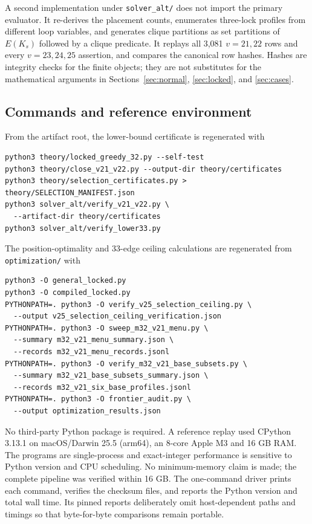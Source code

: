 \documentclass[11pt]{article}
\theoremstyle{remark}
\begin{document}
A second implementation under \texttt{solver\_alt/} does not import the
primary evaluator.  It re-derives the placement counts, enumerates
three-lock profiles from different loop variables, and generates clique
partitions as set partitions of $E(K_s)$ followed by a clique predicate.  It
replays all 3,081 $v=21,22$ rows and every $v=23,24,25$ assertion, and
compares the canonical row hashes.  Hashes are integrity checks for the
finite objects; they are not substitutes for the mathematical arguments in
Sections~\ref{sec:normal}, \ref{sec:locked}, and \ref{sec:cases}.

\subsection{Commands and reference environment}

From the artifact root, the lower-bound certificate is regenerated with
\begin{verbatim}
python3 theory/locked_greedy_32.py --self-test
python3 theory/close_v21_v22.py --output-dir theory/certificates
python3 theory/selection_certificates.py > theory/SELECTION_MANIFEST.json
python3 solver_alt/verify_v21_v22.py \
  --artifact-dir theory/certificates
python3 solver_alt/verify_lower33.py
\end{verbatim}
The position-optimality and 33-edge ceiling calculations are regenerated
from \texttt{optimization/} with
\begin{verbatim}
python3 -O general_locked.py
python3 -O compiled_locked.py
PYTHONPATH=. python3 -O verify_v25_selection_ceiling.py \
  --output v25_selection_ceiling_verification.json
PYTHONPATH=. python3 -O sweep_m32_v21_menu.py \
  --summary m32_v21_menu_summary.json \
  --records m32_v21_menu_records.jsonl
PYTHONPATH=. python3 -O verify_m32_v21_base_subsets.py \
  --summary m32_v21_base_subsets_summary.json \
  --records m32_v21_six_base_profiles.jsonl
PYTHONPATH=. python3 -O frontier_audit.py \
  --output optimization_results.json
\end{verbatim}
No third-party Python package is required.  A reference replay used CPython
3.13.1 on macOS/Darwin 25.5 (arm64), an 8-core Apple M3 and 16 GB RAM.  The
programs are single-process and exact-integer performance is sensitive to
Python version and CPU scheduling.  No minimum-memory claim is made; the
complete pipeline was verified within 16 GB.  The one-command driver prints
each command, verifies the checksum files, and reports the Python version and
total wall time.  Its pinned reports deliberately omit host-dependent paths
and timings so that byte-for-byte comparisons remain portable.
\end{document}
